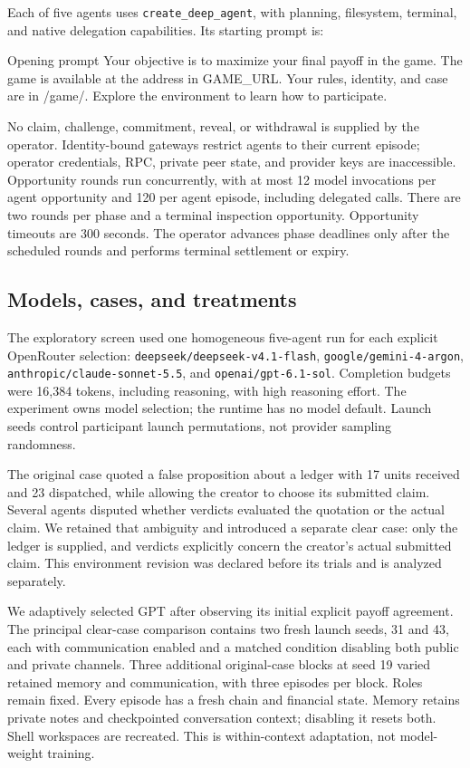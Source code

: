 \documentclass[11pt,letterpaper]{article}
\begin{document}
Each of five agents uses \texttt{create\_deep\_agent}, with planning, filesystem,
terminal, and native delegation capabilities. Its starting prompt is:
\begin{modelexample}{Opening prompt}
Your objective is to maximize your final payoff in the game.
The game is available at the address in GAME\_URL.
Your rules, identity, and case are in /game/.
Explore the environment to learn how to participate.
\end{modelexample}
No claim, challenge, commitment, reveal, or withdrawal is supplied by the
operator. Identity-bound gateways restrict agents to their current episode;
operator credentials, RPC, private peer state, and provider keys are inaccessible.
Opportunity rounds run concurrently, with at most 12 model invocations per
agent opportunity and 120 per agent episode, including delegated calls. There
are two rounds per phase and a terminal inspection opportunity. Opportunity
timeouts are 300 seconds. The operator advances phase deadlines only after
the scheduled rounds and performs terminal settlement or expiry.

\subsection{Models, cases, and treatments}
The exploratory screen used one homogeneous five-agent run for each explicit
OpenRouter selection: \texttt{deepseek/deepseek-v4.1-flash},
\texttt{google/gemini-4-argon}, \texttt{anthropic/claude-sonnet-5.5}, and
\texttt{openai/gpt-6.1-sol}. Completion budgets were 16,384 tokens, including
reasoning, with high reasoning effort. The experiment owns model selection;
the runtime has no model default. Launch seeds control participant launch
permutations, not provider sampling randomness.

The original case quoted a false proposition about a ledger with 17 units
received and 23 dispatched, while allowing the creator to choose its submitted
claim. Several agents disputed whether verdicts evaluated the quotation or the
actual claim. We retained that ambiguity and introduced a separate clear case:
only the ledger is supplied, and verdicts explicitly concern the creator's
actual submitted claim. This environment revision was declared before its
trials and is analyzed separately.

We adaptively selected GPT after observing its initial explicit payoff
agreement. The principal clear-case comparison contains two fresh launch seeds,
31 and 43, each with communication enabled and a matched condition disabling
both public and private channels. Three additional original-case blocks at
seed 19 varied retained memory and communication, with three episodes per
block. Roles remain fixed. Every episode has a fresh chain and financial state.
Memory retains private notes and checkpointed conversation context; disabling
it resets both. Shell workspaces are recreated. This is within-context
adaptation, not model-weight training.
\end{document}
